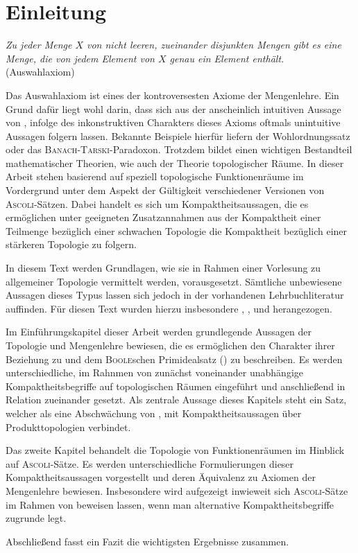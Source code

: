 \chapter*{Einleitung}

\begin{addmargin}[2em]{2em}%
  \textit{Zu jeder Menge $X$ von nicht leeren, zueinander disjunkten Mengen gibt es eine Menge, die von jedem Element von $X$ genau ein Element enthält.} 
  \flushright(Auswahlaxiom)
\end{addmargin}

Das Auswahlaxiom \AC ist eines der kontroversesten Axiome der Mengenlehre.
Ein Grund dafür liegt wohl darin, dass sich aus der anscheinlich intuitiven Aussage von \AC, infolge des inkonstruktiven Charakters dieses Axioms oftmals unintuitive Aussagen folgern lassen.
Bekannte Beispiele hierfür liefern der Wohlordnungssatz oder das \textsc{Banach}-\textsc{Tarski}-Paradoxon.
Trotzdem bildet \AC einen wichtigen Bestandteil mathematischer Theorien, wie auch der Theorie topologischer Räume.
In dieser Arbeit stehen basierend auf \cite{herrlich2006axiom} speziell topologische Funktionenräume im Vordergrund unter dem Aspekt der Gültigkeit verschiedener Versionen von \textsc{Ascoli}-Sätzen.
Dabei handelt es sich um Kompaktheitsaussagen, die es ermöglichen unter geeigneten Zusatzannahmen aus der Kompaktheit einer Teilmenge bezüglich einer schwachen Topologie die Kompaktheit bezüglich einer stärkeren Topologie zu folgern.

In diesem Text werden Grundlagen, wie sie in Rahmen einer Vorlesung zu allgemeiner Topologie vermittelt werden, vorausgesetzt.
Sämtliche unbewiesene Aussagen dieses Typus lassen sich jedoch in der vorhandenen Lehrbuchliteratur auffinden.
Für diesen Text wurden hierzu insbesondere \cite{bartsch2015allgemeine}, \cite{ebbinghaus2003einfuhrung}, \cite{kelley1975general} und \cite{preuss1972topologische} herangezogen.

Im Einführungskapitel dieser Arbeit werden grundlegende Aussagen der Topologie und Mengenlehre bewiesen, die es ermöglichen den Charakter ihrer Beziehung zu \AC und dem \textsc{Boole}schen Primidealsatz (\PIT) zu beschreiben. 
Es werden unterschiedliche, im Rahnmen von \ZF zunächst voneinander unabhängige Kompaktheitsbegriffe auf topologischen Räumen eingeführt und anschließend in Relation zueinander gesetzt.
Als zentrale Aussage dieses Kapitels steht ein Satz, welcher \PIT als eine Abschwächung  von \AC, mit Kompaktheitsaussagen über Produkttopologien verbindet.

Das zweite Kapitel behandelt die Topologie von Funktionenräumen im Hinblick auf \textsc{Ascoli}-Sätze.
Es werden unterschiedliche Formulierungen dieser Kompaktheitsaussagen vorgestellt und deren Äquivalenz zu Axiomen der Mengenlehre bewiesen.
Insbesondere wird aufgezeigt inwieweit sich \textsc{Ascoli}-Sätze im Rahmen von \ZF beweisen lassen, wenn man alternative Kompaktheitsbegriffe zugrunde legt.

Abschließend fasst ein Fazit die wichtigsten Ergebnisse zusammen. 

